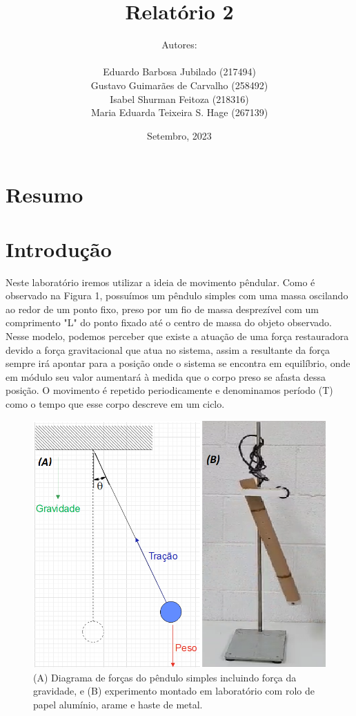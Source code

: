\documentclass[a4paper]{report}
\title{\huge
{\textbf{Relatório 2}}
 \\
\fontsize{30pt}{36pt}\selectfont{\textbf{O Pêndulo Físico}}
}
\author{
Autores:\\ \ \\
Eduardo Barbosa Jubilado (217494)\\
Gustavo Guimarães de Carvalho (258492)\\
Isabel Shurman Feitoza (218316)\\
Maria Eduarda Teixeira S. Hage (267139) 
}
\date{Setembro, 2023}
\begin{document}
\pagestyle{fancy}
\fancyfoot{}\fancyhead{}
\maketitle{}
\pagebreak
{}
\fancyfoot[R]{\thepage}
\section*{Resumo}

\section*{Introdução}
\qquad Neste laboratório iremos utilizar a ideia de movimento pêndular. Como é observado na Figura 1, possuímos um pêndulo simples com uma massa oscilando ao redor de um ponto fixo, preso por um fio de massa desprezível com um comprimento "L" do ponto fixado até o centro de massa do objeto observado. Nesse modelo, podemos perceber que existe a atuação de uma força restauradora devido a força gravitacional que atua no sistema, assim a resultante da força sempre irá apontar para a posição onde o sistema se encontra em equilíbrio, onde em módulo seu valor aumentará à medida que o corpo preso se afasta dessa posição. O movimento é repetido periodicamente e denominamos período (T) como o tempo que esse corpo descreve em um ciclo. 

\begin{figure}[!htb]
    \centering
    \includegraphics[scale=0.5]{pendulo.png}
    \caption{(A) Diagrama de forças do pêndulo simples incluindo força da gravidade, e (B) experimento montado em laboratório com rolo de papel alumínio, arame e haste de metal.}
    \label{fig:Figura 1}
\end{figure}
\end{document}
